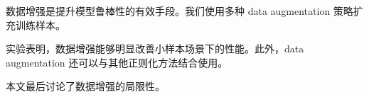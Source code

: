 数据增强是提升模型鲁棒性的有效手段。我们使用多种 data augmentation 策略扩充训练样本。

实验表明，数据增强能够明显改善小样本场景下的性能。此外，data augmentation 还可以与其他正则化方法结合使用。

本文最后讨论了数据增强的局限性。
